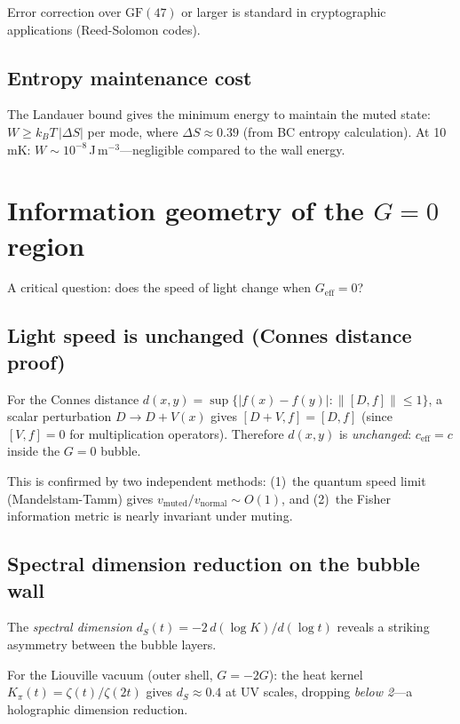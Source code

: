 \documentclass[aps,prd,twocolumn,superscriptaddress,nofootinbib]{revtex4-2}
\begin{document}
Error correction over $\mathrm{GF}(47)$ or larger is standard
in cryptographic applications (Reed-Solomon codes).

\subsection{Entropy maintenance cost}

The Landauer bound gives the minimum energy to maintain the
muted state:
$W \geq k_B T \,|\Delta S|$ per mode,
where $\Delta S \approx 0.39$ (from BC entropy calculation).
At 10\,mK: $W \sim 10^{-8}$\,J\,m$^{-3}$---negligible compared
to the wall energy.

\section{Information geometry of the $G=0$ region}
\label{sec:info}

A critical question: does the speed of light change when
$G_{\mathrm{eff}} = 0$?

\subsection{Light speed is unchanged (Connes distance proof)}

For the Connes distance $d(x,y) = \sup\{|f(x)-f(y)| : \|[D,f]\| \leq 1\}$,
a scalar perturbation $D \to D + V(x)$ gives
$[D+V,f] = [D,f]$ (since $[V,f] = 0$ for multiplication operators).
Therefore $d(x,y)$ is \emph{unchanged}:
$c_{\mathrm{eff}} = c$ inside the $G = 0$ bubble.

This is confirmed by two independent methods:
(1)~the quantum speed limit (Mandelstam-Tamm) gives
$v_{\mathrm{muted}}/v_{\mathrm{normal}} \sim O(1)$, and
(2)~the Fisher information metric is nearly invariant under muting.

\subsection{Spectral dimension reduction on the bubble wall}

The \emph{spectral dimension} $d_S(t) = -2\,d(\log K)/d(\log t)$
reveals a striking asymmetry between the bubble layers.

For the Liouville vacuum (outer shell, $G = -2G$):
the heat kernel $K_\pi(t) = \zeta(t)/\zeta(2t)$
gives $d_S \approx 0.4$ at UV scales,
dropping \emph{below 2}---a holographic dimension reduction.
\end{document}
